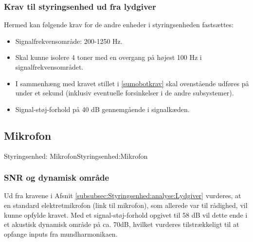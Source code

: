 {\subsubsection{Krav til styringsenhed ud fra lydgiver}
Hermed kan følgende krav for de andre enheder i styringsenheden fastsættes:
\begin{itemize}
    \item Signalfrekvensområde: 200-1250 Hz.
    \item Skal kunne isolere 4 toner med en overgang på højest 100 Hz i signalfrekvensområdet.
    \item I sammenhæng med kravet stillet i \ref{sumobotkrav} skal ovenstående udføres på under et sekund (inklusiv eventuelle forsinkelser i de andre subsystemer).
    \item Signal-støj-forhold på 40 dB gennemgående i signalkæden.
\end{itemize}

\subsection{Mikrofon}
\begin{PartBlokDescription}{Styringsenhed: Mikrofon}{Styringsenhed:Mikrofon}
\end{PartBlokDescription}

\subsubsection{SNR og dynamisk område}
Ud fra kravene i Afsnit \ref{subsubsec:Styringsenhed:analyse:Lydgiver} vurderes, at en standard elektretmikrofon \tbr (link til mikrofon), som allerede var til rådighed, vil kunne opfylde kravet.
Med et signal-støj-forhold opgivet til 58 dB vil dette ende i et akustisk dynamisk område på ca. 70dB\cite{Lewis2012}, hvilket vurderes tilstrækkeligt til at opfange inputs fra mundharmonikaen. 

}
